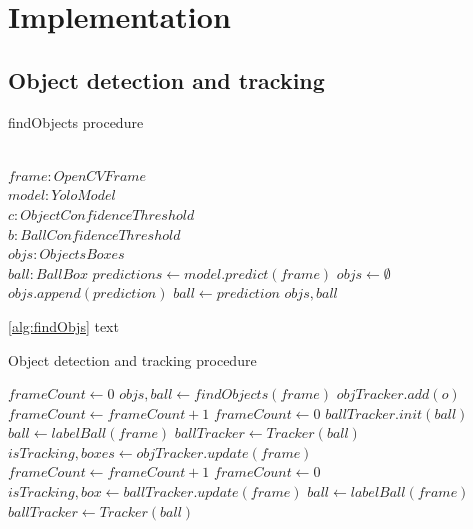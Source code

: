 \documentclass[
    11pt,
    twoside
]{report}
\begin{document}
\chapter{Implementation}







\section{Object detection and tracking}


\begin{algorithm}[H]
\begin{algorithmic}
\caption{findObjects procedure}\label{alg:findObjs}
\Require \\
    $frame: OpenCVFrame$ \\
    $model: YoloModel$ \\
    $c: ObjectConfidenceThreshold$ \\
    $b: BallConfidenceThreshold$
\Ensure \\
    $objs: ObjectsBoxes$ \\
    $ball: BallBox$
\State
\State $predictions \gets model.predict(frame)$
\State $objs \gets \emptyset$
        \State $objs.append(prediction)$
    \EndIf
        \State $ball \gets prediction$
    \EndIf
\EndFor
\State
\Return $objs, ball$
\end{algorithmic}
\end{algorithm}


\ref{alg:findObjs} text


\begin{algorithm}[H]
\begin{algorithmic}
\caption{Object detection and tracking procedure}\label{alg:detect_tracking}
\State $frameCount \gets 0$
        \State $objs, ball \gets findObjects(frame)$
                \State $objTracker.add(o)$
            \EndFor
            \State $frameCount \gets frameCount + 1$
        \Else
            \State $frameCount \gets 0$
        \EndIf
            \State $ballTracker.init(ball)$
        \Else
            \State $ball \gets labelBall(frame)$
            \State $ballTracker \gets Tracker(ball)$
        \EndIf
    \Else
        \State $isTracking, boxes \gets objTracker.update(frame)$
            \State $frameCount \gets frameCount + 1$
        \Else
            \State $frameCount \gets 0$
        \EndIf
        \State $isTracking, box \gets ballTracker.update(frame)$
            \State $ball \gets labelBall(frame)$
            \State $ballTracker \gets Tracker(ball)$
        \EndIf
    \EndIf
\EndFor
\end{algorithmic}
\end{algorithm}
\end{document}
